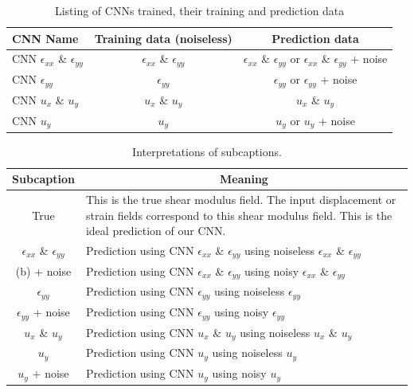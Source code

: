 \documentclass[12pt]{article}
\begin{document}
\begin{table}
  \centering
  \begin{tabular}{|l|c|c|}
    \hline
    CNN Name & Training data (noiseless) & Prediction data \\
    \hline
    CNN $\epsilon_{xx}$ \& $\epsilon_{yy}$ & $\epsilon_{xx}$ \& $\epsilon_{yy}$ & $\epsilon_{xx}$ \& $\epsilon_{yy}$ or $\epsilon_{xx}$ \& $\epsilon_{yy}$ + noise\\
    \hline
    CNN $\epsilon_{yy}$ & $\epsilon_{yy}$ & $\epsilon_{yy}$ or $\epsilon_{yy}$ + noise\\
    \hline
    CNN $u_x$ \& $u_y$ & $u_x$ \& $u_y$ & $u_x$ \& $u_y$\\
    \hline
    CNN $u_y$ & $u_y$ & $u_y$ or $u_y$ + noise\\
    \hline
  \end{tabular}
  \caption{\label{tab:cnnone:io} Listing of CNNs trained, their training and prediction data}
\end{table}
%
\begin{table}
  \centering
   \begin{tabular}{cp{8cm}}
    \hline
    \multicolumn{1}{|c|}{Subcaption} & \multicolumn{1}{c|}{Meaning}\\
    \hline
    \multicolumn{1}{|c|}{True} & \multicolumn{1}{p{8cm}|}{This is the true shear modulus field. The input displacement or strain fields correspond to this shear modulus field. This is the ideal prediction of our CNN.}\\
    \hline
    \multicolumn{1}{|c|}{$\epsilon_{xx}$ \& $\epsilon_{yy}$} & \multicolumn{1}{p{8cm}|}{Prediction using CNN $\epsilon_{xx}$ \& $\epsilon_{yy}$ using noiseless $\epsilon_{xx}$ \& $\epsilon_{yy}$}\\
    \hline
    \multicolumn{1}{|c|}{(b) + noise} & \multicolumn{1}{p{8cm}|}{Prediction using CNN $\epsilon_{xx}$ \& $\epsilon_{yy}$ using noisy $\epsilon_{xx}$ \& $\epsilon_{yy}$}\\
    \hline
    \multicolumn{1}{|c|}{$\epsilon_{yy}$} & \multicolumn{1}{p{8cm}|}{Prediction using CNN $\epsilon_{yy}$ using noiseless $\epsilon_{yy}$}\\
    \hline
    \multicolumn{1}{|c|}{$\epsilon_{yy}$ + noise} & \multicolumn{1}{p{8cm}|}{Prediction using CNN $\epsilon_{yy}$ using noisy $\epsilon_{yy}$}\\
    \hline
    \multicolumn{1}{|c|}{$u_x$ \& $u_y$} & \multicolumn{1}{p{8cm}|}{Prediction using CNN $u_x$ \& $u_y$  using noiseless $u_x$ \& $u_y$ }\\
    \hline
    \multicolumn{1}{|c|}{$u_y$} & \multicolumn{1}{p{8cm}|}{Prediction using CNN $u_y$  using noiseless $u_y$ }\\
    \hline
    \multicolumn{1}{|c|}{$u_y$ + noise} & \multicolumn{1}{p{8cm}|}{Prediction using CNN $u_y$  using noisy $u_y$ }\\
    \hline
  \end{tabular}
  \caption{\label{tab:subcap} Interpretations of subcaptions.}
\end{table}
\end{document}

